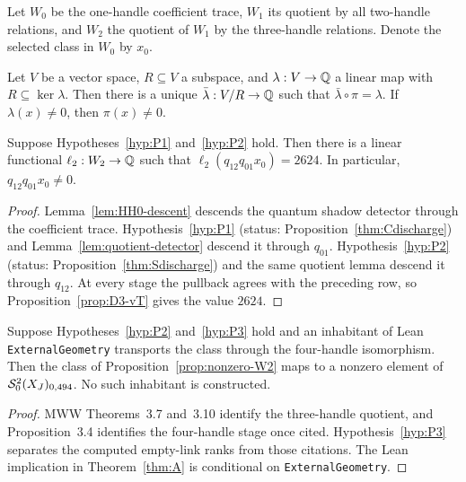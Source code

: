 Let $W_0$ be the one-handle coefficient trace, $W_1$ its quotient by all
two-handle relations, and $W_2$ the quotient of $W_1$ by the three-handle
relations.  Denote the selected class in $W_0$ by $x_0$.

\begin{lemma}\label{lem:quotient-detector}
Let $V$ be a vector space, $R\subseteq V$ a subspace, and
$\lambda:V\to\mathbb{Q}$ a linear map with $R\subseteq\ker\lambda$.  Then there is a
unique $\bar\lambda:V/R\to\mathbb{Q}$ such that
$\bar\lambda\circ\pi=\lambda$.  If $\lambda(x)\ne0$, then $\pi(x)\ne0$.
\end{lemma}

\begin{proposition}\label{prop:nonzero-W2}
Suppose Hypotheses~\ref{hyp:P1} and~\ref{hyp:P2} hold.  Then there is a
linear functional $\ell_2:W_2\to\mathbb{Q}$ such that
$\ell_2(q_{12}q_{01}x_0)=2624$.  In particular, $q_{12}q_{01}x_0\ne0$.
\end{proposition}

\begin{proof}
Lemma~\ref{lem:HH0-descent} descends the quantum shadow detector through the
coefficient trace.  Hypothesis~\ref{hyp:P1} (status:
Proposition~\ref{thm:Cdischarge}) and Lemma~\ref{lem:quotient-detector}
descend it through $q_{01}$.  Hypothesis~\ref{hyp:P2} (status:
Proposition~\ref{thm:Sdischarge}) and the same quotient lemma descend it
through $q_{12}$.
At every stage the pullback agrees with the preceding row, so
Proposition~\ref{prop:D3-vT} gives the value $2624$.
\end{proof}

\begin{proposition}\label{prop:closed-class}
Suppose Hypotheses~\ref{hyp:P2} and~\ref{hyp:P3} hold and an inhabitant of
Lean \texttt{ExternalGeometry} transports the class through the four-handle
isomorphism.  Then the class of Proposition~\ref{prop:nonzero-W2} maps to a
nonzero element of $\mathcal{S}^{2}_{0}(X_J)_{0,494}$.  No such inhabitant is constructed.
\end{proposition}

\begin{proof}
MWW Theorems~3.7 and~3.10 identify the three-handle quotient, and
Proposition~3.4 identifies the four-handle stage once cited.
Hypothesis~\ref{hyp:P3} separates the computed empty-link ranks from those
citations.  The Lean implication in Theorem~\ref{thm:A} is conditional on
\texttt{ExternalGeometry}.
\end{proof}

